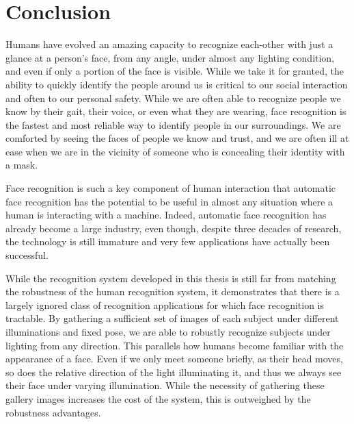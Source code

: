 \chapter{Conclusion}
\label{chap:conclusion}

Humans have evolved an amazing capacity to recognize each-other with just a
glance at a person's face, from any angle, under almost any lighting condition,
and even if only a portion of the face is visible.  While we take it for
granted, the ability to quickly identify the people around us is critical to
our social interaction and often to our personal safety.  While we are often
able to recognize people we know by their gait, their voice, or even what they
are wearing, face recognition is the fastest and
most reliable way to identify people in our surroundings.  We are comforted by
seeing the faces of people we know and trust, and we are often ill at ease when
we are in the vicinity of someone who is concealing their identity with a mask.  

Face recognition is such a key component of human interaction that automatic
face recognition has the potential to be useful in almost any situation where a
human is interacting with a machine.  Indeed, automatic face recognition has
already become a large industry, even though, despite three decades of
research, the technology is still immature and very few applications have
actually been successful.

While the recognition system developed in this thesis is still far from
matching the robustness of the human recognition system, it demonstrates that
there is a largely ignored class of recognition applications for which face
recognition is tractable.  By gathering a sufficient set of images of each
subject under different illuminations and fixed pose, we are able to robustly
recognize subjects under lighting from any direction.  This parallels how
humans become familiar with the appearance of a face. Even if we only meet
someone briefly, as their head moves, so does the relative direction of the
light illuminating it, and thus we always see their face under varying
illumination.  While the necessity of gathering these gallery images increases
the cost of the system, this is outweighed by the robustness advantages.

